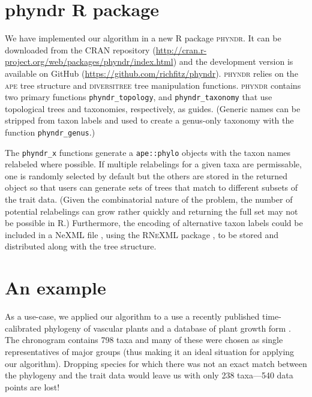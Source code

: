 \documentclass[a4paper,11pt]{article}
\begin{document}
\section{phyndr R package}

We have implemented our algorithm in a new R package \textsc{phyndr}. It can be downloaded from the CRAN repository (\url{http://cran.r-project.org/web/packages/phyndr/index.html}) and the development version is available on GitHub (\url{https://github.com/richfitz/phyndr}). \textsc{phyndr} relies on the \textsc{ape} \citep{ape} tree structure and \textsc{diversitree} \citep{FitzJohn2012} tree manipulation functions. \textsc{phyndr} contains two primary functions \texttt{phyndr\_topology}, and \texttt{phyndr\_taxonomy} that use topological trees and taxonomies, respectively, as guides. (Generic names can be stripped from taxon labels and used to create a genus-only taxonomy with the function \texttt{phyndr\_genus}.) 

The \texttt{phyndr\_x} functions generate a \texttt{ape::phylo} objects with the taxon names relabeled where possible. If multiple relabelings for a given taxa are permissable, one is randomly selected by default but the others are stored in the returned object so that users can generate sets of trees that match to different subsets of the trait data. (Given the combinatorial nature of the problem, the number of potential relabelings can grow rather quickly and returning the full set may not be possible in R.) Furthermore, the encoding of alternative taxon labels could be included in a NeXML file \citep{nexml}, using the \textsc{RNeXML} package \citep{rnexml}, to be stored and distributed along with the tree structure.

\section{An example}

As a use-case, we applied our algorithm to a use a recently published time-calibrated phylogeny of vascular plants \citep{Magallon2015} and a database of plant growth form \citep{Zanne}. The \citet{Magallon2015} chronogram contains 798 taxa and many of these were chosen as single representatives of major groups (thus making it an ideal situation for applying our algorithm). Dropping species for which there was not an exact match between the phylogeny and the trait data would leave us with only 238 taxa---540 data points are lost!
\end{document}
